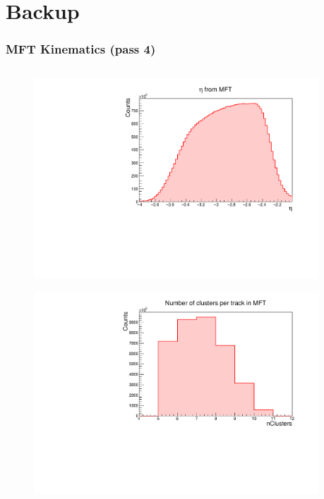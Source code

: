 \documentclass[10pt]{beamer}
\begin{document}

\section{Backup}

\begin{frame}
    \frametitle{MFT Kinematics (pass 4)}

    \begin{columns}
        \begin{column}{0.5\textwidth}
            \vspace*{-0.43cm}
            \begin{figure}
                \begin{center}
                    \includegraphics[width=0.95\textwidth]{Plots/pass4_MFT/MFTeta_pass4.pdf}
                \end{center}
            \end{figure}
            \vspace*{-0.6cm}
            \begin{figure}
                \begin{center}
                    \includegraphics[width=0.95\textwidth]{Plots/pass4_MFT/nClusters_pass4.pdf}

\end{center}
\end{figure}
\end{column}
\end{columns}
\end{frame}
\end{document}
